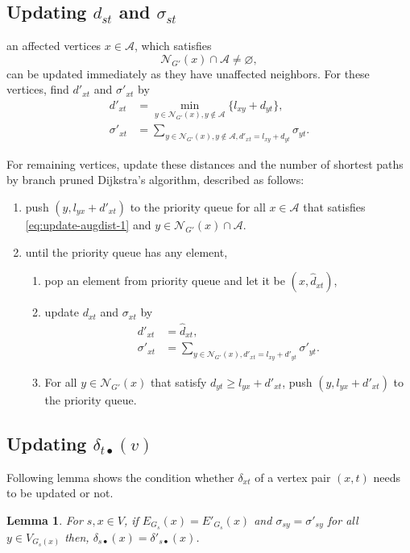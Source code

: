 \documentclass{article}
\newtheorem{lemma}{Lemma}
\begin{document}
\subsection*{Updating $d_{st}$ and $\sigma_{st}$}
an affected vertices $x\in \mathcal{A}$, which satisfies
\begin{equation}
  \mathcal{N}_{G'}(x)\cap\mathcal{A}\neq\varnothing,
  \label{eq:update-augdist-1}
\end{equation}
can be updated immediately as they have unaffected neighbors.
For these vertices, find $d'_{xt}$ and $\sigma'_{xt}$ by
\begin{equation*}
  \begin{aligned}
    d'_{xt}&=\min_{y\in\mathcal{N}_{G'}(x),y\notin\mathcal{A}}\{l_{xy}+d_{yt}\}, \\
    \sigma'_{xt}&=\sum_{y\in\mathcal{N}_{G'}(x),y\notin\mathcal{A},d'_{xt}=l_{xy}+d_{yt}}\sigma_{yt}.
  \end{aligned}
\end{equation*}

For remaining vertices, update these distances and the number of shortest paths by branch pruned Dijkstra's algorithm, described as follows:
\begin{enumerate}
\item push $(y,l_{yx}+d'_{xt})$ to the priority queue for all $x\in\mathcal{A}$ that satisfies \eqref{eq:update-augdist-1} and $y\in\mathcal{N}_{G'}(x)\cap\mathcal{A}$.
\item until the priority queue has any element,
  \begin{enumerate}
  \item pop an element from priority queue and let it be $(x,\hat{d}_{xt})$,
  \item update $d_{xt}$ and $\sigma_{xt}$ by
    \begin{equation*}
      \begin{aligned}
        d'_{xt}&=\hat{d}_{xt}, \\
        \sigma'_{xt}&=\sum_{y\in\mathcal{N}_{G'}(x),d'_{xt}=l_{xy}+d'_{yt}}\sigma'_{yt}.
      \end{aligned}
    \end{equation*}
  \item For all $y\in\mathcal{N}_{G'}(x)$ that satisfy $d_{yt}\geq l_{yx}+d'_{xt}$, push $(y,l_{yx}+d'_{xt})$ to the priority queue.
  \end{enumerate}
\end{enumerate}

\subsection*{Updating $\delta_{t\bullet}(v)$}
Following lemma shows the condition whether $\delta_{xt}$ of a vertex pair $(x,t)$ needs to be updated or not.
\begin{lemma}
  \label{lm:update-delta-1}
  For $s,x\in V$, if $E_{G_s}(x)=E'_{G_s}(x)$ and $\sigma_{sy}=\sigma'_{sy}$ for all $y\in V_{G_s(x)}$ then, $\delta_{s\bullet}(x)=\delta'_{s\bullet}(x)$.
\end{lemma}
\end{document}
